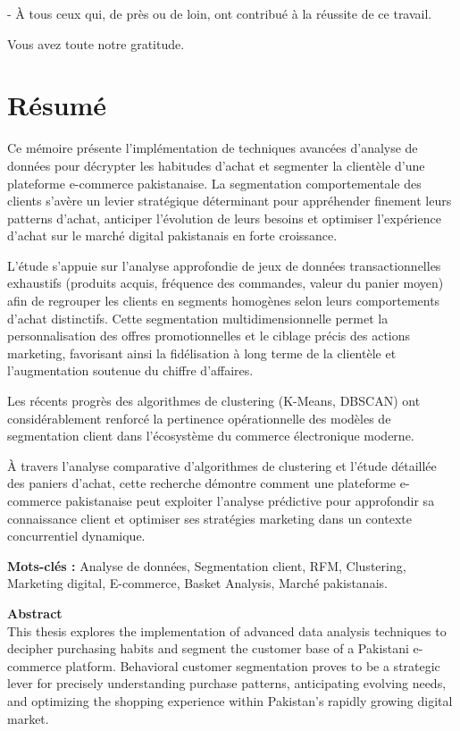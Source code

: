 \documentclass[a4paper,12pt]{article}
\begin{document}
- À tous ceux qui, de près ou de loin, ont contribué à la réussite de ce travail.

Vous avez toute notre gratitude.

\chapter*{Résumé}
\vspace{1cm}

Ce mémoire présente l'implémentation de techniques avancées d'analyse de données pour décrypter les habitudes d'achat et segmenter la clientèle d'une plateforme e-commerce pakistanaise. La segmentation comportementale des clients s'avère un levier stratégique déterminant pour appréhender finement leurs patterns d'achat, anticiper l'évolution de leurs besoins et optimiser l'expérience d'achat sur le marché digital pakistanais en forte croissance.

L'étude s'appuie sur l'analyse approfondie de jeux de données transactionnelles exhaustifs (produits acquis, fréquence des commandes, valeur du panier moyen) afin de regrouper les clients en segments homogènes selon leurs comportements d'achat distinctifs. Cette segmentation multidimensionnelle permet la personnalisation des offres promotionnelles et le ciblage précis des actions marketing, favorisant ainsi la fidélisation à long terme de la clientèle et l'augmentation soutenue du chiffre d'affaires.

Les récents progrès des algorithmes de clustering (K-Means, DBSCAN) ont considérablement renforcé la pertinence opérationnelle des modèles de segmentation client dans l'écosystème du commerce électronique moderne.

À travers l'analyse comparative d'algorithmes de clustering et l'étude détaillée des paniers d'achat, cette recherche démontre comment une plateforme e-commerce pakistanaise peut exploiter l'analyse prédictive pour approfondir sa connaissance client et optimiser ses stratégies marketing dans un contexte concurrentiel dynamique.

\textbf{Mots-clés :} Analyse de données, Segmentation client, RFM, Clustering, Marketing digital, E-commerce, Basket Analysis, Marché pakistanais.

\vspace{1cm}
{\LARGE
\textbf{Abstract}}\\

This thesis explores the implementation of advanced data analysis techniques to decipher purchasing habits and segment the customer base of a Pakistani e-commerce platform. Behavioral customer segmentation proves to be a strategic lever for precisely understanding purchase patterns, anticipating evolving needs, and optimizing the shopping experience within Pakistan's rapidly growing digital market.
\end{document}
